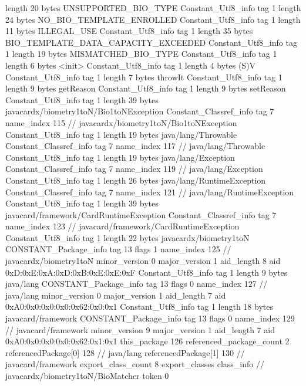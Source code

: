 {{{			length	20
			bytes	UNSUPPORTED_BIO_TYPE
		}
		Constant_Utf8_info {
			tag	1
			length	24
			bytes	NO_BIO_TEMPLATE_ENROLLED
		}
		Constant_Utf8_info {
			tag	1
			length	11
			bytes	ILLEGAL_USE
		}
		Constant_Utf8_info {
			tag	1
			length	35
			bytes	BIO_TEMPLATE_DATA_CAPACITY_EXCEEDED
		}
		Constant_Utf8_info {
			tag	1
			length	19
			bytes	MISMATCHED_BIO_TYPE
		}
		Constant_Utf8_info {
			tag	1
			length	6
			bytes	<init>
		}
		Constant_Utf8_info {
			tag	1
			length	4
			bytes	(S)V
		}
		Constant_Utf8_info {
			tag	1
			length	7
			bytes	throwIt
		}
		Constant_Utf8_info {
			tag	1
			length	9
			bytes	getReason
		}
		Constant_Utf8_info {
			tag	1
			length	9
			bytes	setReason
		}
		Constant_Utf8_info {
			tag	1
			length	39
			bytes	javacardx/biometry1toN/Bio1toNException
		}
		Constant_Classref_info {
			tag	7
			name_index	115		// javacardx/biometry1toN/Bio1toNException
		}
		Constant_Utf8_info {
			tag	1
			length	19
			bytes	java/lang/Throwable
		}
		Constant_Classref_info {
			tag	7
			name_index	117		// java/lang/Throwable
		}
		Constant_Utf8_info {
			tag	1
			length	19
			bytes	java/lang/Exception
		}
		Constant_Classref_info {
			tag	7
			name_index	119		// java/lang/Exception
		}
		Constant_Utf8_info {
			tag	1
			length	26
			bytes	java/lang/RuntimeException
		}
		Constant_Classref_info {
			tag	7
			name_index	121		// java/lang/RuntimeException
		}
		Constant_Utf8_info {
			tag	1
			length	39
			bytes	javacard/framework/CardRuntimeException
		}
		Constant_Classref_info {
			tag	7
			name_index	123		// javacard/framework/CardRuntimeException
		}
		Constant_Utf8_info {
			tag	1
			length	22
			bytes	javacardx/biometry1toN
		}
		CONSTANT_Package_info {
			tag	13
			flags	1
			name_index	125		// javacardx/biometry1toN
			minor_version	0
			major_version	1
			aid_length	8
			aid	0xD:0xE:0xA:0xD:0xB:0xE:0xE:0xF
		}
		Constant_Utf8_info {
			tag	1
			length	9
			bytes	java/lang
		}
		CONSTANT_Package_info {
			tag	13
			flags	0
			name_index	127		// java/lang
			minor_version	0
			major_version	1
			aid_length	7
			aid	0xA0:0x0:0x0:0x0:0x62:0x0:0x1
		}
		Constant_Utf8_info {
			tag	1
			length	18
			bytes	javacard/framework
		}
		CONSTANT_Package_info {
			tag	13
			flags	0
			name_index	129		// javacard/framework
			minor_version	9
			major_version	1
			aid_length	7
			aid	0xA0:0x0:0x0:0x0:0x62:0x1:0x1
		}
	}
	this_package	126
	referenced_package_count	2
	referencedPackage[0]	128		// java/lang
	referencedPackage[1]	130		// javacard/framework
	export_class_count	8
	export_classes {
		class_info {		// javacardx/biometry1toN/BioMatcher
			token	0
}}}
